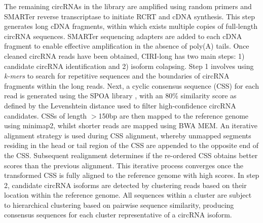 \documentclass[pdflatex,sn-mathphys-num]{sn-jnl}
\begin{document}
The remaining circRNAs in the library are amplified using random primers and SMARTer reverse transcriptase to initiate RCRT and cDNA synthesis. This step generates long cDNA fragments, within which exists multiple copies of full-length circRNA sequences. SMARTer sequencing adapters are added to each cDNA fragment to enable effective amplification in the absence of poly(A) tails. Once cleaned circRNA reads have been obtained, CIRI-long has two main steps: 1) candidate circRNA identification and 2) isoform colapsing. Step 1 involves using \textit{k-mers} to search for repetitive sequences and the boundaries of circRNA fragments within the long reads. Next, a cyclic consensus sequence (CSS) for each read is generated using the SPOA library \cite{Vaser2017May}, with an 80\% similarity score as defined by the Levenshtein distance used to filter high-confidence circRNA candidates. CSSs of length $>$150bp are then mapped to the reference genome using minimap2, whilst shorter reads are mapped using BWA MEM. An iterative alignment strategy is used during CSS alignment, whereby unmapped segments residing in the head or tail region of the CSS are appended to the opposite end of the CSS. Subsequent realignment determines if the re-ordered CSS obtains better scores than the previous alignment. This iterative process converges once the transformed CSS is fully aligned to the reference genome with high scores. In step 2, candidate circRNA isoforms are detected by clustering reads based on their location within the reference genome. All sequences within a cluster are subject to hierarchical clustering based on pairwise sequence similarity, producing consensus sequences for each cluster representative of a circRNA isoform. \par
\end{document}
